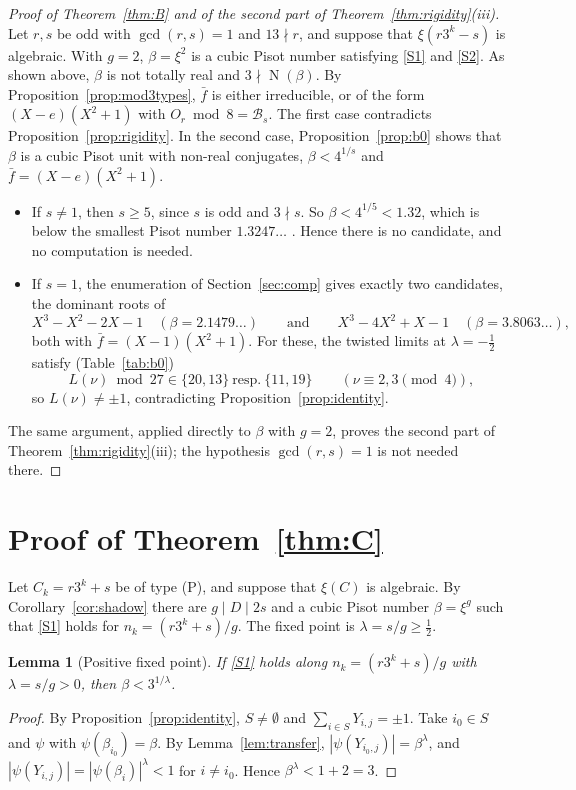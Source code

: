 \documentclass[11pt,a4paper]{article}
\newtheorem{lemma}[theorem]{Lemma}
\theoremstyle{definition}
\theoremstyle{remark}
\DeclareMathOperator{\Nm}{N}
\begin{document}
\begin{proof}[Proof of Theorem~\ref{thm:B} and of the second part of Theorem~\ref{thm:rigidity}\textup{(iii)}]
Let $r,s$ be odd with $\gcd(r,s)=1$ and $13\nmid r$, and suppose that $\xi(r3^k-s)$ is algebraic.
With $g=2$, $\beta=\xi^2$ is a cubic Pisot number satisfying \ref{S1} and \ref{S2}.
As shown above, $\beta$ is not totally real and $3\nmid\Nm(\beta)$.
By Proposition~\ref{prop:mod3types}, $\bar f$ is either irreducible, or of the form $(X-e)(X^2+1)$ with $O_r\bmod 8=\mathcal B_s$.
The first case contradicts Proposition~\ref{prop:rigidity}.
In the second case, Proposition~\ref{prop:b0} shows that $\beta$ is a cubic Pisot unit with non-real conjugates, $\beta<4^{1/s}$ and $\bar f=(X-e)(X^2+1)$.
\begin{itemize}
\item If $s\ne1$, then $s\ge5$, since $s$ is odd and $3\nmid s$. So $\beta<4^{1/5}<1.32$, which is below the smallest Pisot number $1.3247\ldots$ \cite{Sie44}. Hence there is no candidate, and no computation is needed.
\item If $s=1$, the enumeration of Section~\ref{sec:comp} gives exactly two candidates, the dominant roots of
\[
 X^3-X^2-2X-1\quad(\beta=2.1479\ldots)\qquad\text{and}\qquad X^3-4X^2+X-1\quad(\beta=3.8063\ldots),
\]
both with $\bar f=(X-1)(X^2+1)$.
For these, the twisted limits at $\lambda=-\frac12$ satisfy (Table~\ref{tab:b0})
\[
 L(\nu)\bmod 27\in\{20,13\}\ \text{resp.}\ \{11,19\}\qquad(\nu\equiv2,3\pmod4),
\]
so $L(\nu)\ne\pm1$, contradicting Proposition~\ref{prop:identity}.
\end{itemize}
The same argument, applied directly to $\beta$ with $g=2$, proves the second part of Theorem~\ref{thm:rigidity}(iii); the hypothesis $\gcd(r,s)=1$ is not needed there.
\end{proof}

\section{Proof of Theorem~\ref{thm:C}}\label{sec:C}

Let $C_k=r3^k+s$ be of type (P), and suppose that $\xi(C)$ is algebraic.
By Corollary~\ref{cor:shadow} there are $g\mid D\mid 2s$ and a cubic Pisot number $\beta=\xi^g$ such that \ref{S1} holds for $n_k=(r3^k+s)/g$.
The fixed point is $\lambda=s/g\ge\frac12$.

\begin{lemma}[Positive fixed point]\label{lem:posbound}
If \ref{S1} holds along $n_k=(r3^k+s)/g$ with $\lambda=s/g>0$, then $\beta<3^{1/\lambda}$.
\end{lemma}
\begin{proof}
By Proposition~\ref{prop:identity}, $S\ne\emptyset$ and $\sum_{i\in S}Y_{i,j}=\pm1$.
Take $i_0\in S$ and $\psi$ with $\psi(\beta_{i_0})=\beta$.
By Lemma~\ref{lem:transfer}, $|\psi(Y_{i_0,j})|=\beta^{\lambda}$, and $|\psi(Y_{i,j})|=|\psi(\beta_i)|^{\lambda}<1$ for $i\ne i_0$.
Hence $\beta^{\lambda}<1+2=3$.
\end{proof}
\end{document}
